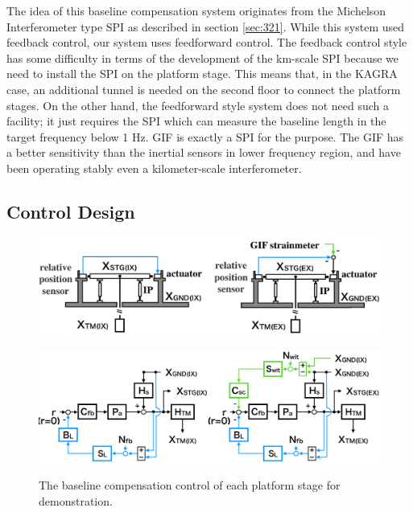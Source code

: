 The idea of this baseline compensation system originates from the Michelson Interferometer type SPI as described in section \ref{sec:321}. While this system used feedback control, our system uses feedforward control. The feedback control style has some difficulty in terms of the development of the km-scale SPI because we need to install the SPI on the platform stage. This means that, in the KAGRA case, an additional tunnel is needed on the second floor to connect the platform stages. On the other hand, the feedforward style system does not need such a facility; it just requires the SPI which can measure the baseline length in the target frequency below 1 Hz. GIF is exactly a SPI for the purpose. The GIF has a better sensitivity than the inertial sensors in lower frequency region, and have been operating stably even a kilometer-scale interferometer. 

\subsection{Control Design}
\begin{figure}[h]
  \begin{minipage}{14cm}
    \begin{center}   
      \includegraphics[width=14cm]{./img_chap6/img630a.png}
      \label{img:img630a} \hfill\vspace{10pt}
    \end{center}
  \end{minipage}
  \begin{minipage}{14cm}
    \begin{center}   
      \includegraphics[width=14cm]{./img_chap6/img630b.png}
      \label{img:img630b}
    \end{center}
  \end{minipage}
  \caption{The baseline compensation control of each platform stage for demonstration.}
\end{figure}

